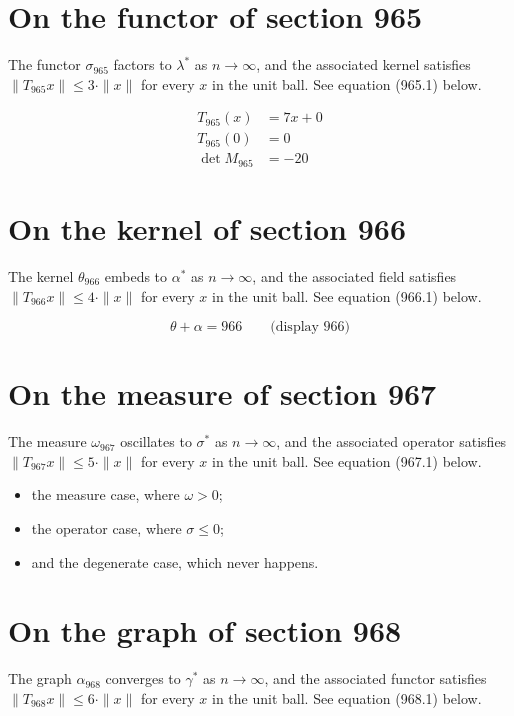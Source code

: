 \documentclass{article}
\begin{document}
\section{On the functor of section 965}
The functor $\sigma_{965}$ factors to $\lambda^{*}$ as $n \to \infty$,
and the associated kernel satisfies $\|T_{965} x\| \leq 3 \cdot \|x\|$
for every $x$ in the unit ball. See equation (965.1) below.

\begin{align}
T_{965}(x) &= 7 x + 0 \\
T_{965}(0) &= 0 \\
\det M_{965} &= -20
\end{align}

\section{On the kernel of section 966}
The kernel $\theta_{966}$ embeds to $\alpha^{*}$ as $n \to \infty$,
and the associated field satisfies $\|T_{966} x\| \leq 4 \cdot \|x\|$
for every $x$ in the unit ball. See equation (966.1) below.

$$
\theta + \alpha = 966 \qquad \text{(display 966)}
$$

\section{On the measure of section 967}
The measure $\omega_{967}$ oscillates to $\sigma^{*}$ as $n \to \infty$,
and the associated operator satisfies $\|T_{967} x\| \leq 5 \cdot \|x\|$
for every $x$ in the unit ball. See equation (967.1) below.

\begin{itemize}
  \item the measure case, where $\omega > 0$;
  \item the operator case, where $\sigma \leq 0$;
  \item and the degenerate case, which never happens.
\end{itemize}

\section{On the graph of section 968}
The graph $\alpha_{968}$ converges to $\gamma^{*}$ as $n \to \infty$,
and the associated functor satisfies $\|T_{968} x\| \leq 6 \cdot \|x\|$
for every $x$ in the unit ball. See equation (968.1) below.
\end{document}
